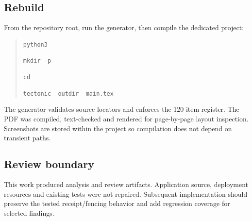 \documentclass[11pt,a4paper]{article}
\begin{document}
\subsection{Rebuild}
From the repository root, run the generator, then compile the dedicated project:
\begin{quote}\small\raggedright
\texttt{python3 }\par
\texttt{mkdir -p }\par
\texttt{cd }\par
\texttt{tectonic --outdir }\texttt{ main.tex}
\end{quote}
The generator validates source locators and enforces the 120-item register. The PDF was compiled, text-checked and rendered for page-by-page layout inspection. Screenshots are stored within the project so compilation does not depend on transient paths.
\subsection{Review boundary}
This work produced analysis and review artifacts. Application source, deployment resources and existing tests were not repaired. Subsequent implementation should preserve the tested receipt/fencing behavior and add regression coverage for selected findings.
\end{document}
